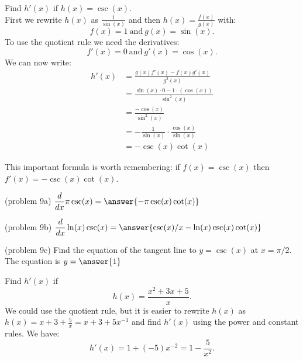 \documentclass{ximera}
\begin{document}
\begin{example}[example 9]
Find $h'(x)$ if $h(x) = \csc(x).$\\
First we rewrite $h(x)$ as $\displaystyle{\frac{1}{\sin(x)}}$ 
and then $\displaystyle{h(x) = \frac{f(x)}{g(x)}}$ with:
\[f(x) = 1 \  \mbox{and} \  g(x)= \sin(x).\]
To use the quotient rule we need the derivatives:
\[f'(x) = 0 \  \mbox{and} \   g'(x) = \cos(x).\]
We can now write: 
\begin{align*}
h'(x) &= \frac{g(x)f'(x) - f(x)g'(x)}{g^2(x)}\\
&= \frac{\sin(x)\cdot 0 - 1\cdot (\cos(x))}{\sin^2(x)}\\
&= \frac{ -\cos(x)}{\sin^2(x)} \\
&= -\frac{ 1}{\sin(x)} \cdot \frac{\cos(x)}{\sin(x)}\\
&=  -\csc(x) \cot(x)
\end{align*}

This important formula is worth remembering: if $f(x) = \csc(x)$ then $f'(x) =-\csc(x) \cot(x)$.
\end{example}



\begin{problem}(problem 9a)
  $\displaystyle{\frac{d}{dx} \pi\csc(x)= \answer{-\pi\csc(x)\cot(x)}}$\\
\end{problem}

\begin{problem}(problem 9b)
  $\displaystyle{\frac{d}{dx} \ln(x) \csc(x)= \answer{\csc(x)/x - \ln(x)\csc(x)\cot(x)}}$\\
\end{problem}

\begin{problem}(problem 9c)
  Find the equation of the tangent line to $y = \csc(x)$ at $x = \pi/2$.\\
  The equation is $y = \answer{1}$
\end{problem}






\begin{example}[example 10]
Find $h'(x)$ if 
\[
h(x) = \frac{x^2 + 3x + 5}{x}.
\]
We could use the quotient rule, 
but it is easier to rewrite $h(x)$ as $h(x) = x + 3 + \frac{5}{x} = x + 3 + 5x^{-1}$ and 
find $h'(x)$ using the power and constant rules.  We have:
\[h'(x) = 1 + (-5)x^{-2} = 1 - \frac{5}{x^2}.\] 
\end{example}
\end{document}
